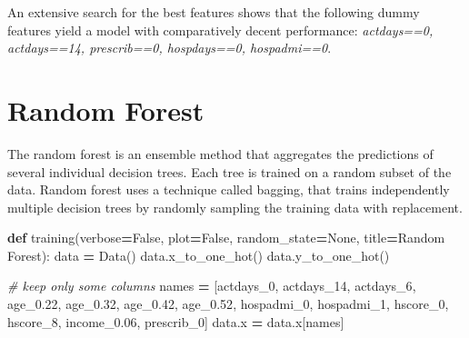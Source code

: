 \documentclass[
]{article}
\newenvironment{Shaded}{\begin{snugshade}}{\end{snugshade}}
\newcommand{\CommentTok}[1]{\textcolor[rgb]{0.56,0.35,0.01}{\textit{#1}}}
\newcommand{\KeywordTok}[1]{\textcolor[rgb]{0.13,0.29,0.53}{\textbf{#1}}}
\newcommand{\NormalTok}[1]{#1}
\newcommand{\OperatorTok}[1]{\textcolor[rgb]{0.81,0.36,0.00}{\textbf{#1}}}
\newcommand{\StringTok}[1]{\textcolor[rgb]{0.31,0.60,0.02}{#1}}
\newcommand{\VariableTok}[1]{\textcolor[rgb]{0.00,0.00,0.00}{#1}}
\begin{document}
An extensive search for the best features shows that the following dummy
features yield a model with comparatively decent performance:
\emph{actdays==0, actdays==14, prescrib==0, hospdays==0, hospadmi==0}.

\section{Random Forest}\label{random-forest}

The random forest is an ensemble method that aggregates the predictions
of several individual decision trees. Each tree is trained on a random
subset of the data. Random forest uses a technique called bagging, that
trains independently multiple decision trees by randomly sampling the
training data with replacement.

\begin{Shaded}
\begin{Highlighting}[]

\KeywordTok{def}\NormalTok{ training(verbose}\OperatorTok{=}\VariableTok{False}\NormalTok{, plot}\OperatorTok{=}\VariableTok{False}\NormalTok{, random\_state}\OperatorTok{=}\VariableTok{None}\NormalTok{, title}\OperatorTok{=}\StringTok{\textquotesingle{}Random Forest\textquotesingle{}}\NormalTok{):}
\NormalTok{    data }\OperatorTok{=}\NormalTok{ Data()}
\NormalTok{    data.x\_to\_one\_hot()}
\NormalTok{    data.y\_to\_one\_hot()}

    \CommentTok{\# keep only some columns}
\NormalTok{    names }\OperatorTok{=}\NormalTok{ [}\StringTok{\textquotesingle{}actdays\_0\textquotesingle{}}\NormalTok{, }\StringTok{\textquotesingle{}actdays\_14\textquotesingle{}}\NormalTok{, }\StringTok{\textquotesingle{}actdays\_6\textquotesingle{}}\NormalTok{, }\StringTok{\textquotesingle{}age\_0.22\textquotesingle{}}\NormalTok{,}
             \StringTok{\textquotesingle{}age\_0.32\textquotesingle{}}\NormalTok{, }\StringTok{\textquotesingle{}age\_0.42\textquotesingle{}}\NormalTok{, }\StringTok{\textquotesingle{}age\_0.52\textquotesingle{}}\NormalTok{, }\StringTok{\textquotesingle{}hospadmi\_0\textquotesingle{}}\NormalTok{,}
             \StringTok{\textquotesingle{}hospadmi\_1\textquotesingle{}}\NormalTok{, }\StringTok{\textquotesingle{}hscore\_0\textquotesingle{}}\NormalTok{, }\StringTok{\textquotesingle{}hscore\_8\textquotesingle{}}\NormalTok{, }\StringTok{\textquotesingle{}income\_0.06\textquotesingle{}}\NormalTok{,}
             \StringTok{\textquotesingle{}prescrib\_0\textquotesingle{}}\NormalTok{]}
\NormalTok{    data.x }\OperatorTok{=}\NormalTok{ data.x[names]}


\end{Highlighting}
\end{Shaded}
\end{document}
